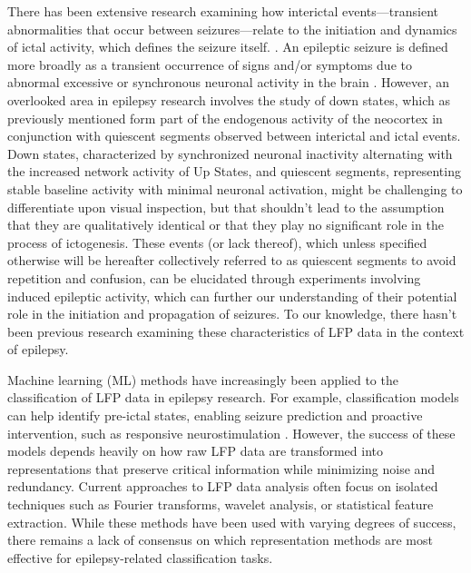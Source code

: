 \documentclass{article}
\begin{document}
There has been extensive research examining how interictal events—transient abnormalities that occur between seizures—relate to the initiation and dynamics of ictal activity, which defines the seizure itself. \cite{karoly2016}. An epileptic seizure is defined more broadly as a transient occurrence of signs and/or symptoms due to abnormal excessive or synchronous neuronal activity in the brain \cite{falco2018}. However, an overlooked area in epilepsy research involves the study of down states, which as previously mentioned form part of the endogenous activity of the neocortex \cite{kajikawa2022} in conjunction with quiescent segments observed between interictal and ictal events. Down states, characterized by synchronized neuronal inactivity alternating with the increased network activity of Up States, and quiescent segments, representing stable baseline activity with minimal neuronal activation, might be challenging to differentiate upon visual inspection, but that shouldn’t lead to the assumption that they are qualitatively identical or that they play no significant role in the process of ictogenesis. These events (or lack thereof), which unless specified otherwise will be hereafter collectively referred to as quiescent segments to avoid repetition and confusion, can be elucidated through experiments involving induced epileptic activity, which can further our understanding of their potential role in the initiation and propagation of seizures. To our knowledge, there hasn’t been previous research examining these characteristics of LFP data in the context of epilepsy.

Machine learning (ML) methods have increasingly been applied to the classification of LFP data in epilepsy research. For example, classification models can help identify pre-ictal states, enabling seizure prediction and proactive intervention, such as responsive neurostimulation \cite{gadhoumi2016}. However, the success of these models depends heavily on how raw LFP data are transformed into representations that preserve critical information while minimizing noise and redundancy. Current approaches to LFP data analysis often focus on isolated techniques such as Fourier transforms, wavelet analysis, or statistical feature extraction. While these methods have been used with varying degrees of success, there remains a lack of consensus on which representation methods are most effective for epilepsy-related classification tasks.
\end{document}
